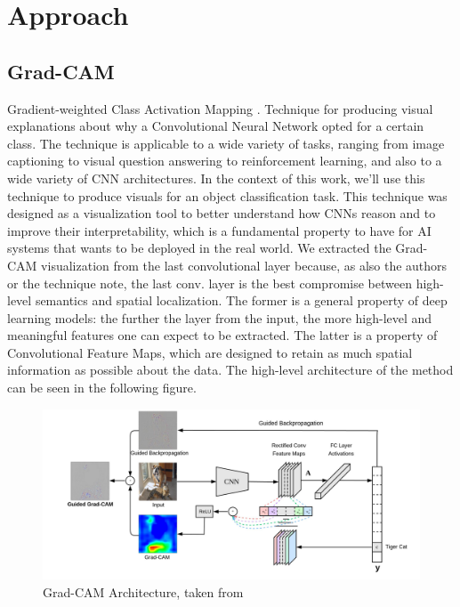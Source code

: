 \documentclass[../main.tex]{subfiles}
\begin{document}
    \section{Approach}

    \subsection{Grad-CAM}
    Gradient-weighted Class Activation Mapping \cite{gradcam}. Technique for producing visual explanations
    about why a Convolutional Neural Network opted for a certain class. The technique is applicable to a wide
    variety of tasks, ranging from image captioning to visual question answering to reinforcement learning, and
    also to a wide variety of CNN architectures. In the context of this work, we'll use this technique to
    produce visuals for an object classification task.
    This technique was designed as a visualization tool to better understand how CNNs reason and to improve
    their interpretability, which is a fundamental property to have for AI systems that wants to be deployed
    in the real world.
    We extracted the Grad-CAM visualization from the last convolutional layer because, as also the authors
    or the technique note, the last conv. layer is the best compromise between high-level semantics and spatial
    localization. The former is a general property of deep learning models: the further the layer from the input,
    the more high-level and meaningful features one can expect to be extracted. The latter is a property of
    Convolutional Feature Maps, which are designed to retain as much spatial information as possible about
    the data.
    The high-level architecture of the method can be seen in the following figure.

	\begin{figure}[h!]
    	\includegraphics[width=\linewidth]{img/gradcam-architecture.png}
	    \caption{Grad-CAM Architecture, taken from \cite{gradcam}}
    	\label{fig:gradcam-architecture}
	\end{figure}
\end{document}

